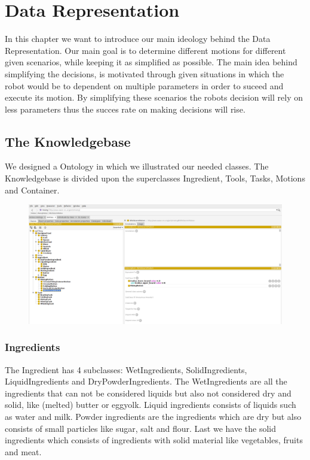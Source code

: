 \chapter*{Data Representation}

In this chapter we want to introduce our main ideology behind the Data Representation. Our main goal is to determine different motions for different given scenarios, while keeping it as simplified as possible.
The main idea behind simplifying the decisions, is motivated through given situations in which the robot would be to dependent on multiple parameters in order to suceed and execute its motion.
By simplifying these scenarios the robots decision will rely on less parameters thus the succes rate on making decisions will rise.

\section*{The Knowledgebase}
We designed a Ontology in which we illustrated our needed classes. 
The Knowledgebase is divided upon the superclasses Ingredient, Tools, Tasks, Motions and Container.
\begin{figure}[H]
\includegraphics[scale=0.3]{Graphics/Ontology.png}
\end{figure}
\subsection*{Ingredients}
The Ingredient has 4 subclasses: WetIngredients, SolidIngredients, LiquidIngredients and DryPowderIngredients.
The WetIngredients are all the ingredients that can not be considered liquids but also not considered dry and solid, like (melted) butter or eggyolk. 
Liquid ingredients consists of liquids such as water and milk. Powder ingredients are the ingredients which are dry but also consists of small particles like sugar, salt and flour.
Last we have the solid ingredients which consists of ingredients with solid material like vegetables, fruits and meat.

